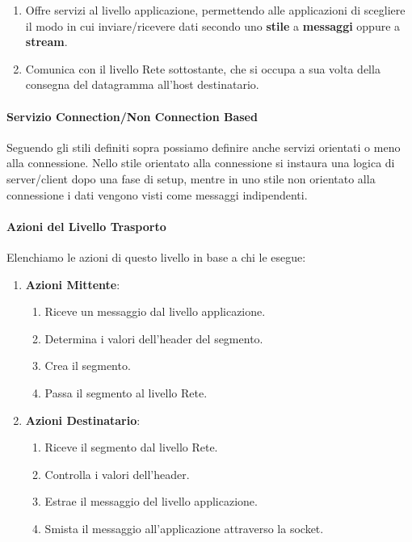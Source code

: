 \documentclass{article}
\begin{document}
\begin{enumerate}
    \item Offre servizi al livello applicazione, permettendo alle applicazioni di scegliere il modo in cui inviare/ricevere dati secondo uno \textbf{stile} a \textbf{messaggi} oppure a \textbf{stream}.
    \item Comunica con il livello Rete sottostante, che si occupa a sua volta della consegna del datagramma all'host destinatario. 
\end{enumerate}

\paragraph{Servizio Connection/Non Connection Based} Seguendo gli stili definiti sopra possiamo definire anche servizi orientati o meno alla connessione. Nello stile orientato alla connessione
si instaura una logica di server/client dopo una fase di setup, mentre in uno stile non orientato alla connessione i dati vengono visti come messaggi indipendenti.

\paragraph{Azioni del Livello Trasporto} Elenchiamo le azioni di questo livello in base a chi le esegue:

\begin{enumerate}
    \item \textbf{Azioni Mittente}:
    \begin{enumerate}
        \item Riceve un messaggio dal livello applicazione.
        \item Determina i valori dell'header del segmento.
        \item Crea il segmento.
        \item Passa il segmento al livello Rete.
    \end{enumerate}
    \item \textbf{Azioni Destinatario}:
    \begin{enumerate}
        \item Riceve il segmento dal livello Rete.
        \item Controlla i valori dell'header.
        \item Estrae il messaggio del livello applicazione.
        \item Smista il messaggio all'applicazione attraverso la socket.
    \end{enumerate}
\end{enumerate}
\end{document}
